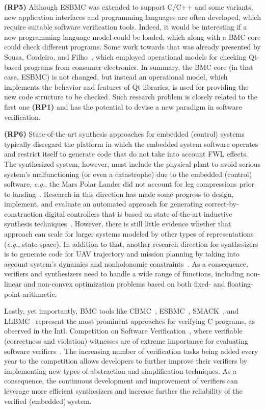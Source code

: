 \documentclass{acm_sen_article}
\begin{document}
{\textbf{(RP5)} Although ESBMC \cite{Cordeiro12} was extended to support C/C++ and some variants, new application interfaces and programming languages are often developed, which require suitable software verification tools. Indeed, it would be interesting if a new programming language model could be loaded, which along with a BMC core could check different programs. Some work towards that was already presented by Sousa, Cordeiro, and Filho~\cite{Garcia16}, which employed operational models for checking Qt-based programs from consumer electronics. In summary, the BMC core (in that case, ESBMC) is not changed, but instead an operational model, which implements the behavior and features of Qt libraries, is used for providing the new code structure to be checked. Such research problem is closely related to the first one \textbf{(RP1)} and has the potential to devise a new paradigm in software verification.

{\textbf{(RP6)} State-of-the-art synthesis approaches for embedded (control) systems typically disregard the platform in which the embedded system software operates and restrict itself to generate code that do not take into account FWL effects. The synthesized system, however, must include the physical plant to avoid serious system's malfunctioning (or even a catastrophe) due to the embedded (control) software, {\it e.g.}, the Mars Polar Lander did not account for leg compressions prior to landing~\cite{Jackson16}. Research in this direction has made some progress to design, implement, and evaluate an automated approach for generating correct-by-construction digital controllers that is based on state-of-the-art inductive synthesis techniques~\cite{Abate17}. However, there is still little evidence whether that approach can scale for larger systems modeled by other types of representations ({\it e.g.}, state-space). In addition to that, another research direction for synthesizers is to generate code for UAV trajectory and mission planning by taking into account system's dynamics and nonholonomic constraints~\cite{Araujo16}. As a consequence, verifiers and synthesizers need to handle a wide range of functions, including non-linear and non-convex optimization problems based on both fixed- and floating-point arithmetic.

Lastly, yet importantly, BMC tools like CBMC~\cite{Clarke04}, ESBMC~\cite{MorseCNF13,MorseRCN014}, SMACK~\cite{Haran15}, and LLBMC~\cite{MerzFS12} represent the most prominent approaches for verifying C programs, as observed in the Intl. Competition on Software Verification~\cite{Beyer14,BeyerSVCOMP15,Beyer16}, where verifiable (correctness and violation) witnesses are of extreme importance for evaluating software verifiers~\cite{BeyerW15,RochaIFM12}. The increasing number of verification tasks being added every year to the competition allows developers to further improve their verifiers by implementing new types of abstraction and simplification techniques. As a consequence, the continuous development and improvement of verifiers can leverage more efficient synthesizers and increase further the reliability of the verified (embedded) system.

}}
\end{document}
